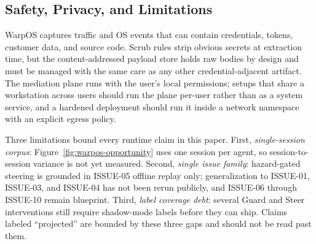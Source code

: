 \documentclass[conference]{IEEEtran}
\begin{document}
\subsection{Safety, Privacy, and Limitations}
\label{app:warpos-limits}

WarpOS captures traffic and OS events that can contain credentials, tokens, customer data, and source code. Scrub rules strip obvious secrets at extraction time, but the content-addressed payload store holds raw bodies by design and must be managed with the same care as any other credential-adjacent artifact. The mediation plane runs with the user's local permissions; setups that share a workstation across users should run the plane per-user rather than as a system service, and a hardened deployment should run it inside a network namespace with an explicit egress policy.

Three limitations bound every runtime claim in this paper. First, \emph{single-session corpus}: Figure~\ref{fig:warpos-opportunity} uses one session per agent, so session-to-session variance is not yet measured. Second, \emph{single issue family}: hazard-gated steering is grounded in ISSUE-05 offline replay only; generalization to ISSUE-01, ISSUE-03, and ISSUE-04 has not been rerun publicly, and ISSUE-06 through ISSUE-10 remain blueprint. Third, \emph{label coverage debt}: several Guard and Steer interventions still require shadow-mode labels before they can ship. Claims labeled ``projected'' are bounded by these three gaps and should not be read past them.



\end{document}

